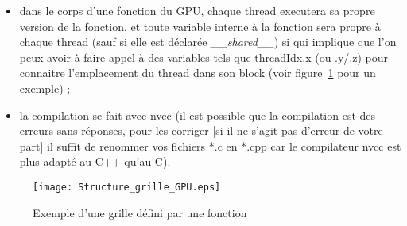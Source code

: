 \documentclass[a4paper,12pt]{article}
\begin{document}
{\begin{itemize}
        \item dans le corps d'une fonction du GPU, chaque thread executera sa propre version de la fonction, et toute variable interne \`a la fonction sera propre \`a chaque thread (sauf si elle est d\'e{}clar\'e{}e \textit{\_\_shared\_\_}) si qui implique que l'on peux avoir \`a faire appel \`a des variables tels que threadIdx.x (ou .y/.z) pour connaitre l'emplacement du thread dans son block (voir figure~\ref{fig:structGrid} pour un exemple) ;
        \item la compilation se fait avec nvcc (il est possible que la compilation est des erreurs sans r\'e{}ponses, pour les corriger [si il ne s'agit pas d'erreur de votre part] il suffit de renommer vos fichiers *.c en *.cpp car le compilateur nvcc est plus adapt\'e au C++ qu'au C).
    \end{itemize}
	\begin{figure}
	    \centering
	    \caption{Exemple d'une grille d\'e{}fini par une fonction}
	    \label{fig:structGrid}
	    \texttt{[image: Structure\_grille\_GPU.eps]}
	\end{figure}
}
\end{document}
